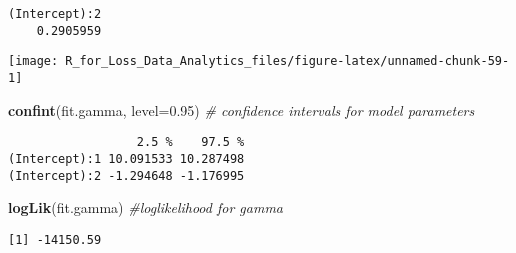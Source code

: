 \documentclass[]{book}
\newenvironment{Shaded}{\begin{snugshade}}{\end{snugshade}}
\newcommand{\KeywordTok}[1]{\textcolor[rgb]{0.13,0.29,0.53}{\textbf{#1}}}
\newcommand{\DataTypeTok}[1]{\textcolor[rgb]{0.13,0.29,0.53}{#1}}
\newcommand{\DecValTok}[1]{\textcolor[rgb]{0.00,0.00,0.81}{#1}}
\newcommand{\FloatTok}[1]{\textcolor[rgb]{0.00,0.00,0.81}{#1}}
\newcommand{\StringTok}[1]{\textcolor[rgb]{0.31,0.60,0.02}{#1}}
\newcommand{\CommentTok}[1]{\textcolor[rgb]{0.56,0.35,0.01}{\textit{#1}}}
\newcommand{\OperatorTok}[1]{\textcolor[rgb]{0.81,0.36,0.00}{\textbf{#1}}}
\newcommand{\NormalTok}[1]{#1}
\theoremstyle{definition}
\theoremstyle{definition}
\theoremstyle{definition}
\theoremstyle{remark}
\begin{document}
\begin{verbatim}
(Intercept):2 
    0.2905959 
\end{verbatim}

\begin{Shaded}
\end{Shaded}

\begin{center}\texttt{[image: R\_for\_Loss\_Data\_Analytics\_files/figure-latex/unnamed-chunk-59-1]} \end{center}

\begin{Shaded}
\begin{Highlighting}[]
\KeywordTok{confint}\NormalTok{(fit.gamma, }\DataTypeTok{level=}\FloatTok{0.95}\NormalTok{)  }\CommentTok{# confidence intervals for model parameters }
\end{Highlighting}
\end{Shaded}

\begin{verbatim}
                  2.5 %    97.5 %
(Intercept):1 10.091533 10.287498
(Intercept):2 -1.294648 -1.176995
\end{verbatim}

\begin{Shaded}
\begin{Highlighting}[]
\KeywordTok{logLik}\NormalTok{(fit.gamma)               }\CommentTok{#loglikelihood for gamma}
\end{Highlighting}
\end{Shaded}

\begin{verbatim}
[1] -14150.59
\end{verbatim}
\end{document}
